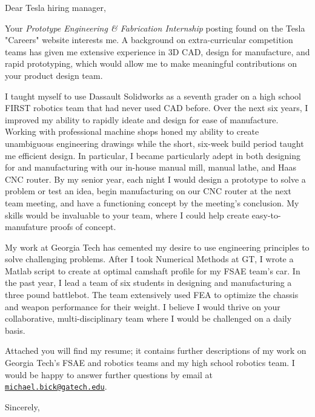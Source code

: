 \documentclass[12pt]{cover_letter}
\date{March 5, 2018}
\begin{document}
  \begin{letter}{}

    \opening{Dear Tesla hiring manager,}

    \thispagestyle{fancy}

    Your \textit{Prototype Engineering \& Fabrication Internship} posting found on the Tesla "Careers" website interests me. A background on extra-curricular competition teams has given me extensive experience in 3D CAD, design for manufacture, and rapid prototyping, which would allow me to make meaningful contributions on your product design team.

    I taught myself to use Dassault Solidworks as a seventh grader on a high school FIRST robotics team that had never used CAD before. Over the next six years, I improved my ability to rapidly ideate and design for ease of manufacture. Working with professional machine shops honed my ability to create unambiguous engineering drawings while the short, six-week build period taught me efficient design. In particular,  I became particularly adept in both designing for and manufacturing with our in-house manual mill, manual lathe, and Haas CNC router. By my senior year, each night I would design a prototype to solve a problem or test an idea, begin manufacturing on our CNC router at the next team meeting, and have a functioning concept by the meeting's conclusion. My skills would be invaluable to your team, where I could help create easy-to-manufature proofs of concept.

    My work at Georgia Tech has cemented my desire to use engineering principles to solve challenging problems. After I took Numerical Methods at GT, I wrote a Matlab script to create at optimal camshaft profile for my FSAE team's car. In the past year, I lead a team of six students in designing and manufacturing a three pound battlebot. The team extensively used FEA to optimize the chassis and weapon performance for their weight. I believe I would thrive on your collaborative, multi-disciplinary team where I would be challenged on a daily basis.

    Attached you will find my resume; it contains further descriptions of my work on Georgia Tech's FSAE and robotics teams and my high school robotics team. I would be happy to answer further questions by email at \href{mailto:michael.bick@gatech.edu}{\nolinkurl{michael.bick@gatech.edu}}.

    \closing{Sincerely,}

  \end{letter}

\end{document}
